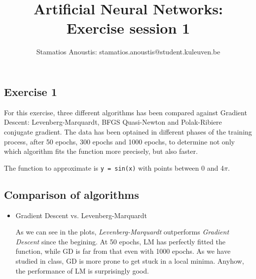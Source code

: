 \documentclass[10pt]{article}
\author{Stamatios Anoustis: stamatios.anoustis@student.kuleuven.be}
\date{}
\title{Artificial Neural Networks: Exercise session 1}
\begin{document}
\maketitle
\begin{multicols}{2}

\section*{Exercise 1}

For this exercise, three different algorithms has been compared against Gradient Descent:
Levenberg-Marquardt, BFGS Quasi-Newton and Polak-Ribiere conjugate gradient.
The data has been optained in different phases of the training process, after 50 epochs,
300 epochs and 1000 epochs, to determine not only which algorithm fits the function more precisely, 
but also faster.

The function to approximate is \texttt{y = sin(x)} with points between 0 and 4$\pi$.

\subsection*{Comparison of algorithms}

\begin{itemize}
\item Gradient Descent vs. Levenberg-Marquardt

As we can see in the plots, \textit{Levenberg-Marquardt} outperforms \textit{Gradient Descent} since the begining.
At 50 epochs, LM has perfectly fitted the function, while GD is far from that even with 1000 epochs. As we have studied in class, GD is more prone to get stuck in a local minima. Anyhow, the performance of LM is surprisingly good.


\end{itemize}
\end{multicols}
\end{document}
